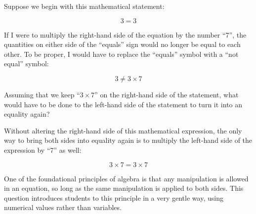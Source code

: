 

Suppose we begin with this mathematical statement:

$$3 = 3$$

If I were to multiply the right-hand side of the equation by the number ``7'', the quantities on either side of the ``equals'' sign would no longer be equal to each other.  To be proper, I would have to replace the ``equals'' symbol with a ``not equal'' symbol:

$$3 \not = 3 \times 7$$ 

Assuming that we keep ``$3 \times 7$'' on the right-hand side of the statement, what would have to be done to the left-hand side of the statement to turn it into an equality again?







Without altering the right-hand side of this mathematical expression, the only way to bring both sides into equality again is to multiply the left-hand side of the expression by ``7'' as well:

$$3 \times 7 = 3 \times 7$$ 







One of the foundational principles of algebra is that any manipulation is allowed in an equation, so long as the same manipulation is applied to both sides.  This question introduces students to this principle in a very gentle way, using numerical values rather than variables.




